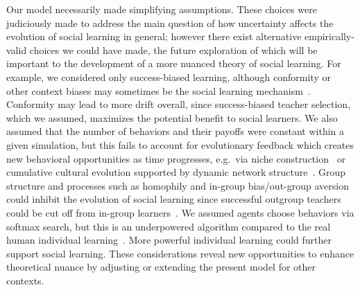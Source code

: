 \documentclass[letterpaper,11.5pt]{scrartcl}
\begin{document}
Our model necessarily made simplifying assumptions. These choices were judiciously made to address the main question of how uncertainty affects the evolution of social learning in general; however there exist alternative empirically-valid choices we could have made, the future exploration of which will be important to the development of a more nuanced theory of social learning.  %
For example, we considered only success-biased
learning, although conformity or other context biases may sometimes be the social learning mechanism~\cite{BoydRicherson1985,Muthukrishna2016a,Smaldino2018b}.  Conformity may lead to more drift
overall, since success-biased teacher selection, which we assumed, maximizes the potential benefit to social learners. We also assumed that the number of behaviors and
their payoffs were constant within a given simulation, but this fails to account for evolutionary feedback which
creates new behavioral opportunities as time progresses, e.g.\ via niche
construction~\cite{Smaldino2012a,Heras-Escribano2020} or cumulative cultural evolution
supported by dynamic network structure~\cite{Smolla2019,Derex2020}.  Group structure
and processes such as homophily and in-group bias/out-group aversion could inhibit the
evolution of social learning since successful outgroup teachers could be cut off from
in-group learners~\cite{Golub2012}. We assumed agents choose behaviors via softmax
search, but this is an underpowered algorithm compared to the real human individual learning~\cite{Schulz2020a,Wu2022}.  More powerful individual learning could further
support social learning.  These considerations reveal new opportunities to enhance theoretical nuance by adjusting or extending the present model for other contexts. 


\end{document}
